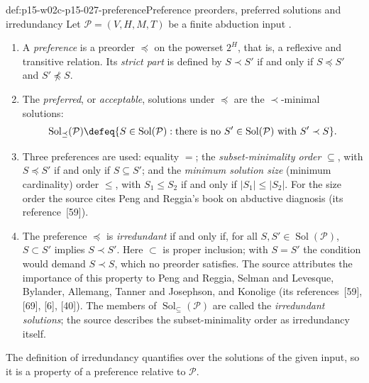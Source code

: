 \begin{hbdefinition}{def:p15-w02c-p15-027-preference}{Preference preorders, preferred solutions and irredundancy}
Let \(\mathcal P=(V,H,M,T)\) be a finite abduction input
\cite[defs.~2.3--2.4, manuscript pp.~10--11]{EiterGottlobAbductionManuscript}.
\begin{enumerate}
\item A \emph{preference} is a preorder \(\preceq\) on the powerset
      \(2^H\), that is, a reflexive and transitive relation. Its
      \emph{strict part} is defined by
      \(S\prec S'\) if and only if \(S\preceq S'\) and \(S'\not\preceq S\).
\item The \emph{preferred}, or \emph{acceptable}, solutions under
      \(\preceq\) are the \(\prec\)-minimal solutions:
      \[
       \operatorname{Sol}_{\preceq}(\mathcal P)
        \defeq\{S\in\operatorname{Sol}(\mathcal P):
          \text{there is no }S'\in\operatorname{Sol}(\mathcal P)
          \text{ with }S'\prec S\}.
      \]
\item Three preferences are used: equality \(=\); the
      \emph{subset-minimality order} \(\subseteq\), with \(S\preceq S'\)
      if and only if \(S\subseteq S'\); and the \emph{minimum solution size}
      (minimum cardinality) order \(\le\), with \(S_1\le S_2\) if and only
      if \(|S_1|\le|S_2|\). For the size order the source cites Peng and
      Reggia's book on abductive diagnosis (its reference~[59]).
\item The preference \(\preceq\) is \emph{irredundant} if and only if,
      for all \(S,S'\in\operatorname{Sol}(\mathcal P)\), \(S\subset S'\)
      implies \(S\prec S'\). Here \(\subset\) is proper inclusion; with
      \(S=S'\) the condition would demand \(S\prec S\), which no preorder
      satisfies. The source attributes the importance of this property to
      Peng and Reggia, Selman and Levesque, Bylander, Allemang, Tanner and
      Josephson, and Konolige (its references~[59], [69], [6], [40]).
      The members of \(\operatorname{Sol}_{\subseteq}(\mathcal P)\) are
      called the \emph{irredundant solutions}; the source describes the
      subset-minimality order as irredundancy itself.
\end{enumerate}
The definition of irredundancy quantifies over the solutions of the given
input, so it is a property of a preference relative to \(\mathcal P\).
\end{hbdefinition}

